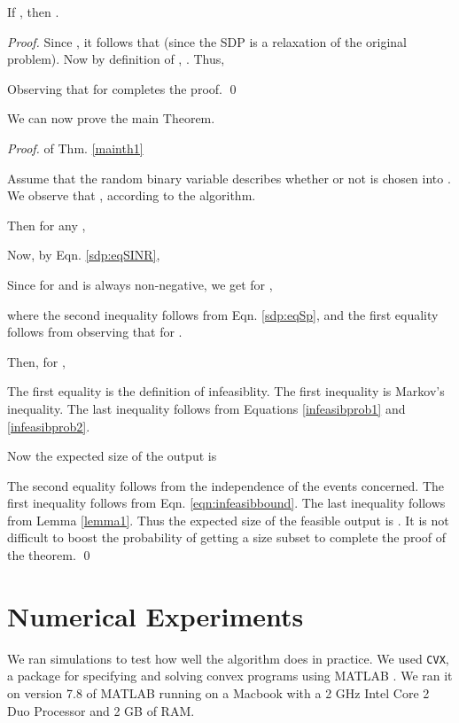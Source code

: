 \documentclass[11pt]{amsart}
\begin{document}
\begin{lemma}
\label{sumdelta}
If , then
.
\label{lemma1}
\end{lemma}
\begin{proof}
Since , it follows that  (since the SDP is a 
relaxation of the original problem). Now by definition of , .
Thus, 


Observing that  for  completes the proof. \qed
\end{proof}

\noindent We can now prove the main Theorem.

\begin{proof}{of Thm. \ref{mainth1}}





 Assume  that the random binary variable  describes whether or not  is chosen into . We observe that
 , according to the algorithm.
 
 Then for any ,
 
 
Now, by Eqn. \ref{sdp:eqSINR},

Since  for  and  is always non-negative, we get for ,

where the second inequality follows from Eqn. \ref{sdp:eqSp}, and the first equality follows from observing that  for .
 
 Then, for ,

The first equality is the definition of infeasiblity. The first inequality is Markov's inequality. The last inequality
follows from Equations \ref{infeasibprob1} and \ref{infeasibprob2}.

Now the expected size of the output is


The second equality follows from the independence of the events concerned. 
The first inequality follows from Eqn. \ref{eqn:infeasibbound}.
The last
inequality follows from Lemma \ref{lemma1}.
Thus the expected size of the feasible output is .
It is not difficult to boost the probability of getting a  size subset to complete
the proof of the theorem. \qed
\end{proof}

\section{Numerical Experiments}
We ran  simulations to test how well the algorithm does in practice. We used \texttt{CVX}, a package for specifying and solving convex programs using MATLAB \cite{cvx}. We ran it on version 7.8 of MATLAB running on a Macbook with a 2 GHz Intel Core 2 Duo Processor and 2 GB of RAM. 
\end{document}
